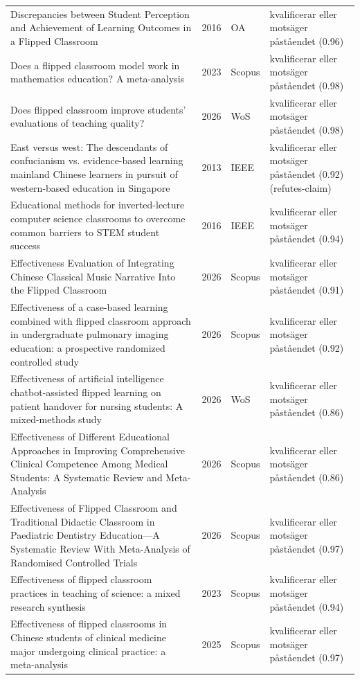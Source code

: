 \begin{longtable}{@{}%
  >{\raggedright\arraybackslash}p{}c%
  >{\raggedright\arraybackslash}p{}%
  >{\raggedright\arraybackslash}p{}@{}}
Discrepancies between Student Perception and Achievement of Learning Outcomes in a Flipped Classroom & 2016 & OA & kvalificerar eller motsäger påståendet (0.96) \\
Does a flipped classroom model work in mathematics education? A meta-analysis & 2023 & Scopus & kvalificerar eller motsäger påståendet (0.98) \\
Does flipped classroom improve students' evaluations of teaching quality? & 2026 & WoS & kvalificerar eller motsäger påståendet (0.98) \\
East versus west: The descendants of confucianism vs. evidence-based learning mainland Chinese learners in pursuit of western-based education in Singapore & 2013 & IEEE & kvalificerar eller motsäger påståendet (0.92) (refutes-claim) \\
Educational methods for inverted-lecture computer science classrooms to overcome common barriers to STEM student success & 2016 & IEEE & kvalificerar eller motsäger påståendet (0.94) \\
Effectiveness Evaluation of Integrating Chinese Classical Music Narrative Into the Flipped Classroom & 2026 & Scopus & kvalificerar eller motsäger påståendet (0.91) \\
Effectiveness of a case-based learning combined with flipped classroom approach in undergraduate pulmonary imaging education: a prospective randomized controlled study & 2026 & Scopus & kvalificerar eller motsäger påståendet (0.92) \\
Effectiveness of artificial intelligence chatbot-assisted flipped learning on patient handover for nursing students: A mixed-methods study & 2026 & WoS & kvalificerar eller motsäger påståendet (0.86) \\
Effectiveness of Different Educational Approaches in Improving Comprehensive Clinical Competence Among Medical Students: A Systematic Review and Meta-Analysis & 2026 & Scopus & kvalificerar eller motsäger påståendet (0.86) \\
Effectiveness of Flipped Classroom and Traditional Didactic Classroom in Paediatric Dentistry Education---A Systematic Review With Meta-Analysis of Randomised Controlled Trials & 2026 & Scopus & kvalificerar eller motsäger påståendet (0.97) \\
Effectiveness of flipped classroom practices in teaching of science: a mixed research synthesis & 2023 & Scopus & kvalificerar eller motsäger påståendet (0.94) \\
Effectiveness of flipped classrooms in Chinese students of clinical medicine major undergoing clinical practice: a meta-analysis & 2025 & Scopus & kvalificerar eller motsäger påståendet (0.97) \\

\end{longtable}
